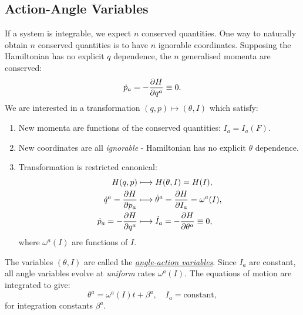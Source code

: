 \documentclass{article}
\begin{document}
\subsection{Action-Angle Variables}
If a system is integrable, we expect $ n $ conserved quantities. One way to naturally obtain $ n $ conserved quantities is to have $ n $ ignorable coordinates. Supposing the Hamiltonian has no explicit $ q $ dependence, the $ n $ generalised momenta are conserved:
\[
	\dot{p}_{a} = - \pdv{H}{q^{a}} \equiv 0.
\]
We are interested in a transformation $ (q, p) \longmapsto (\theta, I) $ which satisfy:
\begin{enumerate}
	\item New momenta are functions of the conserved quantities: $ I_{a} = I_{a}(F) $.
	\item New coordinates are all \textit{ignorable} - Hamiltonian has no explicit $ \theta $ dependence.
	\item Transformation is restricted canonical:
	\begin{align*}
		H(q,p) &\longmapsto H(\theta, I) = H(I), \\
		\dot{q}^{a} = \pdv{H}{p_{a}} &\longmapsto \dot{\theta}^{a} = \pdv{H}{I_{a}} = \omega^{a}(I), \\
		\dot{p}_{a} = -\pdv{H}{q^{a}} &\longmapsto \dot{I}_{a} = -\pdv{H}{\theta^{a}} \equiv 0,
	\end{align*}
	where $ \omega^{a}(I) $ are functions of $ I $.
\end{enumerate}
The variables $ (\theta, I) $ are called the \href{https://en.wikipedia.org/wiki/Action-angle_coordinates}{\textit{angle-action variables}}. Since $ I_{a} $ are constant, all angle variables evolve at \textit{uniform} rates $ \omega^{a}(I) $. The equations of motion are integrated to give:
\begin{equation}
	\theta^{a} = \omega^{a}(I) t + \beta^{a}, \quad I_{a} = \text{constant},
\end{equation}
for integration constants $ \beta^{a} $.
\end{document}
